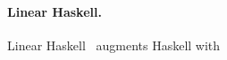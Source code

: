 \documentclass[acmsmall,review,anonymous]{acmart}
\begin{document}

% 
% 

\paragraph{Linear Haskell\label{sec:related-work-linear-haskell}.}
%
%
Linear Haskell~\cite{cite:linearhaskell} augments Haskell with 
\end{document}
